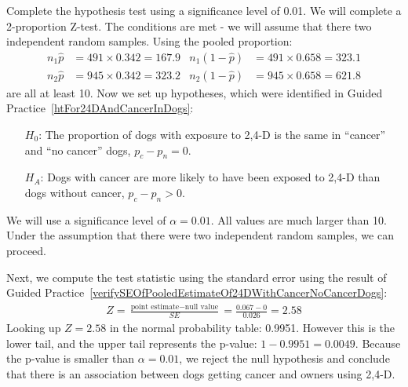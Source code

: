 \begin{example}{Complete the hypothesis test using a significance level of 0.01.}
We will complete a 2-proportion Z-test. The conditions are met  - we will assume that there two independent random samples. Using the pooled proportion:
\begin{align*}
n_1\hat{p} &= 491 \times 0.342 = 167.9
	& n_1(1 - \hat{p}) &= 491 \times 0.658 = 323.1 \\
n_2\hat{p} &= 945 \times 0.342 = 323.2
	& n_2(1 - \hat{p}) &= 945 \times 0.658 = 621.8
\end{align*}
are all at least 10. Now we set up hypotheses, which were identified in Guided Practice~\ref{htFor24DAndCancerInDogs}:
\begin{itemize}
\item[$H_0$:] The proportion of dogs with exposure to 2,4-D is the same in ``cancer'' and ``no cancer'' dogs, $p_c - p_n = 0$.
\item[$H_A$:] Dogs with cancer are more likely to have been exposed to 2,4-D than dogs without cancer, $p_c - p_n > 0$.
\end{itemize}
We will use a significance level of $\alpha = 0.01$. All values are much larger than 10. Under the assumption that there were two independent random samples, we can proceed.

Next, we compute the test statistic using the standard error using the result of Guided Practice~\ref{verifySEOfPooledEstimateOf24DWithCancerNoCancerDogs}:
\begin{eqnarray*}
Z = \frac{\text{point estimate} - \text{null value}}{SE} = \frac{0.067 - 0}{0.026} = 2.58
\end{eqnarray*}
Looking up $Z=2.58$ in the normal probability table: 0.9951. However this is the lower tail, and the upper tail represents the p-value: $1-0.9951 = 0.0049$. Because the p-value is smaller than $\alpha = 0.01$, we reject the null hypothesis and conclude that there is an association between dogs getting cancer and owners using 2,4-D.
\end{example}
 
\textA{\newpage}

